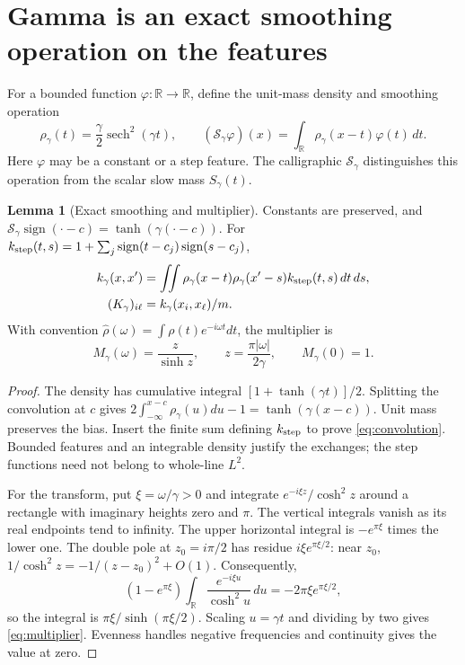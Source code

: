 \documentclass[11pt]{article}
\DeclareMathOperator{\sech}{sech}
\DeclareMathOperator{\sign}{sign}
\theoremstyle{definition}
\newtheorem{lemma}{Lemma}
\begin{document}
\section{Gamma is an exact smoothing operation on the features}
For a bounded function $\varphi:\mathbb R\to\mathbb R$, define the unit-mass
density and smoothing operation
\begin{equation*}
 \rho_\gamma(t)=\frac\gamma2\sech^2(\gamma t),\qquad
 (\mathcal S_\gamma\varphi)(x)=\int_{\mathbb R}\rho_\gamma(x-t)\varphi(t)\,dt.
\end{equation*}
Here $\varphi$ may be a constant or a step feature.
The calligraphic $\mathcal S_\gamma$ distinguishes this operation from the
scalar slow mass $S_\gamma(t)$.
\begin{lemma}[Exact smoothing and multiplier]
Constants are preserved, and
$\mathcal S_\gamma\sign(\cdot-c)=\tanh(\gamma(\cdot-c))$.
For $k_{\rm step}(t,s)=1+\sum_j\sign(t-c_j)\sign(s-c_j)$,
\begin{equation}\label{eq:convolution}
 \begin{split}
 k_\gamma(x,x')&=\iint\rho_\gamma(x-t)\rho_\gamma(x'-s)k_{\rm step}(t,s)\,dt\,ds,\\
 (K_\gamma)_{i\ell}&=k_\gamma(x_i,x_\ell)/m.
 \end{split}
\end{equation}
With convention $\widehat\rho(\omega)=\int\rho(t)e^{-i\omega t}dt$, the multiplier is
\begin{equation}\label{eq:multiplier}
 \boxed{M_\gamma(\omega)=\frac{z}{\sinh z},\qquad
 z=\frac{\pi|\omega|}{2\gamma},\qquad M_\gamma(0)=1.}
\end{equation}
\end{lemma}
\begin{proof}
The density has cumulative integral $[1+\tanh(\gamma t)]/2$. Splitting the
convolution at $c$ gives
$2\int_{-\infty}^{x-c}\rho_\gamma(u)du-1=\tanh(\gamma(x-c))$.
Unit mass preserves the bias. Insert the finite sum defining $k_{\rm step}$
to prove \eqref{eq:convolution}. Bounded features and an integrable density
justify the exchanges; the step functions need not belong to whole-line $L^2$.

For the transform, put $\xi=\omega/\gamma>0$ and integrate
$e^{-i\xi z}/\cosh^2z$ around a rectangle with imaginary heights zero and
$\pi$. The vertical integrals vanish as its real endpoints tend to infinity.
The upper horizontal integral is $-e^{\pi\xi}$ times the lower one. The
double pole at $z_0=i\pi/2$ has residue $i\xi e^{\pi\xi/2}$: near $z_0$,
$1/\cosh^2z=-1/(z-z_0)^2+O(1)$. Consequently,
\begin{equation*}
 (1-e^{\pi\xi})\int_{\mathbb R}\frac{e^{-i\xi u}}{\cosh^2u}\,du
 =-2\pi\xi e^{\pi\xi/2},
\end{equation*}
so the integral is $\pi\xi/\sinh(\pi\xi/2)$. Scaling $u=\gamma t$ and
dividing by two gives \eqref{eq:multiplier}. Evenness handles negative
frequencies and continuity gives the value at zero.
\end{proof}
\end{document}
